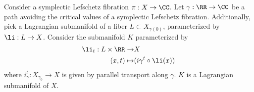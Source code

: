 

    Consider a symplectic Lefschetz fibration $\pi: X\to \CC$. 
    Let $\gamma:\RR\to \CC$ be a path avoiding the critical values of a symplectic Lefschetz fibration. 
    Additionally, pick a Lagrangian submanifold  of a fiber $L\subset X_{\gamma(0)}$, parameterized by $\li: L\to X$.  
    Consider the submanifold $K$ parameterized by 
    \begin{align*}\li_t: L\times \RR\to& X\\
        (x, t) \mapsto&  (i\gamma^t\circ \li(x))
    \end{align*} 
    where $i_\gamma^t: X_{\gamma_0}\to X$ is given by parallel transport along $\gamma$. 
    $K$ is a Lagrangian submanifold of $X$. 

